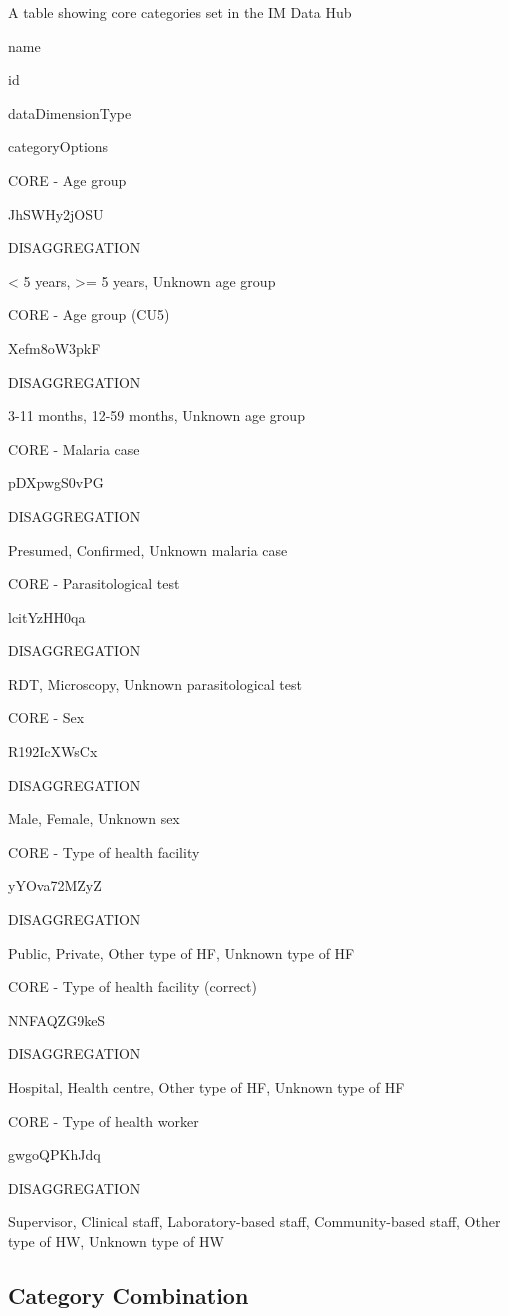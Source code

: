 \documentclass[]{book}
\begin{document}
\label{tab:unnamed-chunk-15}A table showing core categories set in the IM Data Hub

name

id

dataDimensionType

categoryOptions

CORE - Age group

JhSWHy2jOSU

DISAGGREGATION

\textless{} 5 years, \textgreater{}= 5 years, Unknown age group

CORE - Age group (CU5)

Xefm8oW3pkF

DISAGGREGATION

3-11 months, 12-59 months, Unknown age group

CORE - Malaria case

pDXpwgS0vPG

DISAGGREGATION

Presumed, Confirmed, Unknown malaria case

CORE - Parasitological test

lcitYzHH0qa

DISAGGREGATION

RDT, Microscopy, Unknown parasitological test

CORE - Sex

R192IcXWsCx

DISAGGREGATION

Male, Female, Unknown sex

CORE - Type of health facility

yYOva72MZyZ

DISAGGREGATION

Public, Private, Other type of HF, Unknown type of HF

CORE - Type of health facility (correct)

NNFAQZG9keS

DISAGGREGATION

Hospital, Health centre, Other type of HF, Unknown type of HF

CORE - Type of health worker

gwgoQPKhJdq

DISAGGREGATION

Supervisor, Clinical staff, Laboratory-based staff, Community-based staff, Other type of HW, Unknown type of HW

\hypertarget{category-combination}{%
\subsection{Category Combination}\label{category-combination}}
\end{document}
